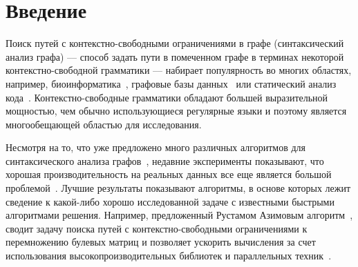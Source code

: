 \documentclass[12pt]{matmex-diploma-custom}
\begin{document}
\makeatletter
\let\@upn\textbf%
\makeatother
\newtheorem{theorem}{Теорема}
\newtheorem{lemma}{Лемма}




\maketitle
\tableofcontents
\section*{Введение}

Поиск путей с контекстно-свободными ограничениями в графе (синтаксический анализ графа) --– способ задать пути в помеченном графе в терминах некоторой контекстно-свободной грамматики –-- набирает популярность во многих областях, например, биоинформатика~\cite{sevon2008subgraph}, графовые базы данных~\cite{Kuijpers:2019:ESC:3335783.3335791,Medeiros:2018:EEC:3167132.3167265,yannakakis1990graph} или статический анализ кода~\cite{zhang2013fast, Reps}. 
Контекстно-свободные грамматики обладают большей выразительной мощностью, чем обычно использующиеся регулярные языки и поэтому является многообещающей областью для исследования. 

Несмотря на то, что уже предложено много различных алгоритмов для синтаксического анализа графов~\cite{azimov2018context,RDF,Medeiros:2018:EEC:3167132.3167265,Verbitskaia:2018:PCC:3241653.3241655,10.1007/978-3-319-91662-0_17}, недавние эксперименты показывают, что хорошая производительность на реальных данных все еще является большой проблемой~\cite{Kuijpers:2019:ESC:3335783.3335791}. 
Лучшие результаты показывают алгоритмы, в основе которых лежит сведение к какой-либо хорошо исследованной задаче с известными быстрыми алгоритмами решения.
Например, предложенный Рустамом Азимовым алгоритм~\cite{azimov2018context}, сводит задачу поиска путей с контекстно-свободными ограничениями к перемножению булевых матриц и позволяет ускорить вычисления за счет использования высокопроизводительных библиотек и параллельных техник~\cite{mishin2019evaluation}.
\end{document}
